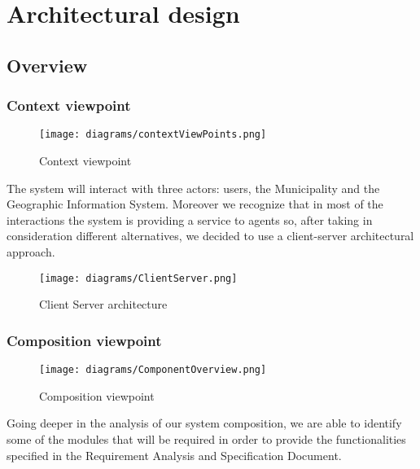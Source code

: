 \setlength{\parindent}{4ex}
\setlength{\parskip}{1ex}

\section{Architectural design}

\subsection{Overview}
	\subsubsection{Context viewpoint}
	
		\begin{figure}[h]
			\centering
			\texttt{[image: diagrams/contextViewPoints.png]}
			\caption{
				\label{fig:contextViewPoint} 
				Context viewpoint
			}
		\end{figure}

		The system will interact with three actors: users, the Municipality and the Geographic Information System.
		Moreover we recognize that in most of the interactions the system is providing a service to agents so, after taking in consideration different alternatives, we decided to use a client-server architectural approach.

		\begin{figure}[h]
			\centering
			\texttt{[image: diagrams/ClientServer.png]}
			\caption{
				\label{fig:ClientServer} 
				Client Server architecture
			}
		\end{figure} 
		
	\subsubsection{Composition viewpoint}
	
		\begin{figure}[h]
			\centering
			\texttt{[image: diagrams/ComponentOverview.png]}
			\caption{
				\label{fig:compositionViewPoint} 
				Composition viewpoint
			}
		\end{figure}
		  
		Going deeper in the analysis of our system composition, we are able to identify some of the modules that will be required in order to provide the functionalities specified in the Requirement Analysis and Specification Document. 
